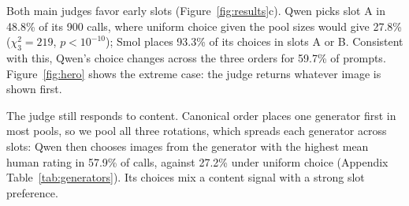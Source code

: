 Both main judges favor early slots (Figure~\ref{fig:results}c). Qwen picks slot A in 48.8\% of its 900 calls, where uniform choice given the pool sizes would give 27.8\% ($\chi^2_{3}=219$, $p<10^{-10}$); Smol places 93.3\% of its choices in slots A or B. Consistent with this, Qwen's choice changes across the three orders for 59.7\% of prompts. Figure~\ref{fig:hero} shows the extreme case: the judge returns whatever image is shown first.

The judge still responds to content. Canonical order places one generator first in most pools, so we pool all three rotations, which spreads each generator across slots: Qwen then chooses images from the generator with the highest mean human rating in 57.9\% of calls, against 27.2\% under uniform choice (Appendix Table~\ref{tab:generators}). Its choices mix a content signal with a strong slot preference.
